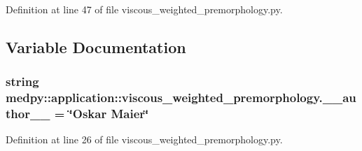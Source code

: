 Definition at line 47 of file viscous\_\-weighted\_\-premorphology.py.



\subsection{Variable Documentation}
\hypertarget{namespacemedpy_1_1application_1_1viscous__weighted__premorphology_a5a3f94f3a2810fe0bf017454bd8421db}{
\subsubsection[{\_\-\_\-author\_\-\_\-}]{\setlength{\rightskip}{0pt plus 5cm}string {\bf medpy::application::viscous\_\-weighted\_\-premorphology.\_\-\_\-author\_\-\_\-} = \char`\"{}Oskar Maier\char`\"{}}}
\label{namespacemedpy_1_1application_1_1viscous__weighted__premorphology_a5a3f94f3a2810fe0bf017454bd8421db}


Definition at line 26 of file viscous\_\-weighted\_\-premorphology.py.


